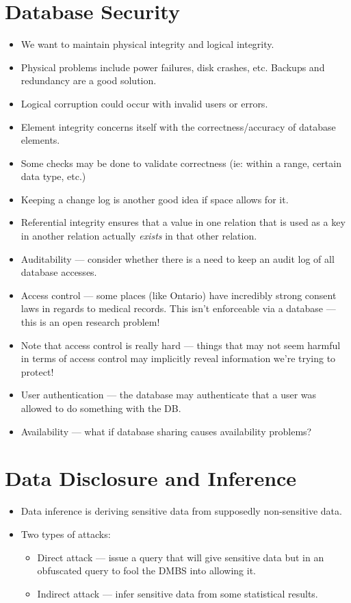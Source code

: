 \documentclass{article}
\begin{document}
\section{Database Security}
\begin{itemize}
    \item We want to maintain physical integrity and logical integrity.
    \item Physical problems include power failures, disk crashes, etc.  Backups and redundancy are a good solution.
    \item Logical corruption could occur with invalid users or errors.
    \item Element integrity concerns itself with the correctness/accuracy of database elements.
    \item Some checks may be done to validate correctness (ie: within a range, certain data type, etc.)
    \item Keeping a change log is another good idea if space allows for it.
    \item Referential integrity ensures that a value in one relation that is used as a key in another relation actually \emph{exists} in that other relation.
    \item Auditability --- consider whether there is a need to keep an audit log of all database accesses.
    \item Access control --- some places (like Ontario) have incredibly strong consent laws in regards to medical records.  This isn't enforceable via a database --- this is an open research problem!
    \item Note that access control is really hard --- things that may not seem harmful in terms of access control may implicitly reveal information we're trying to protect!
    \item User authentication --- the database may authenticate that a user was allowed to do something with the DB.
    \item Availability --- what if database sharing causes availability problems?
\end{itemize}

\section{Data Disclosure and Inference}
\begin{itemize}
    \item Data inference is deriving sensitive data from supposedly non-sensitive data.
    \item Two types of attacks:
        \begin{itemize}
            \item Direct attack --- issue a query that will give sensitive data but in an obfuscated query to fool the DMBS into allowing it.
            \item Indirect attack --- infer sensitive data from some statistical results.
        \end{itemize}
\end{itemize}
\end{document}
